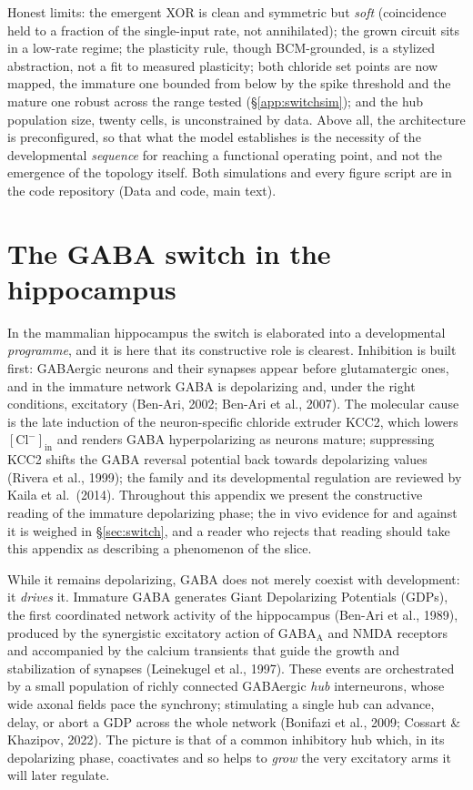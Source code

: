 \documentclass[11pt,a4paper]{article}
\newcommand{\Clm}{\mathrm{Cl}^{-}}
\begin{document}
Honest limits: the emergent XOR is clean and symmetric but \emph{soft} (coincidence held to a fraction of the single-input rate, not annihilated); the grown circuit sits in a low-rate regime; the plasticity rule, though BCM-grounded, is a stylized abstraction, not a fit to measured plasticity; both chloride set points are now mapped, the immature one bounded from below by the spike threshold and the mature one robust across the range tested (\S\ref{app:switchsim}); and the hub population size, twenty cells, is unconstrained by data. Above all, the architecture is preconfigured, so that what the model establishes is the necessity of the developmental \emph{sequence} for reaching a functional operating point, and not the emergence of the topology itself. Both simulations and every figure script are in the code repository (Data and code, main text).


\FloatBarrier
\section{The GABA switch in the hippocampus}\label{app:hipp}
In the mammalian hippocampus the switch is elaborated into a developmental \emph{programme}, and it is here that its constructive role is clearest. Inhibition is built first: GABAergic neurons and their synapses appear before glutamatergic ones, and in the immature network GABA is depolarizing and, under the right conditions, excitatory (Ben-Ari, 2002; Ben-Ari et al., 2007). The molecular cause is the late induction of the neuron-specific chloride extruder KCC2, which lowers $[\Clm]_{\mathrm{in}}$ and renders GABA hyperpolarizing as neurons mature; suppressing KCC2 shifts the GABA reversal potential back towards depolarizing values (Rivera et al., 1999); the family and its developmental regulation are reviewed by Kaila et al.\ (2014). Throughout this appendix we present the constructive reading of the immature depolarizing phase; the in vivo evidence for and against it is weighed in \S\ref{sec:switch}, and a reader who rejects that reading should take this appendix as describing a phenomenon of the slice.

While it remains depolarizing, GABA does not merely coexist with development: it \emph{drives} it. Immature GABA generates Giant Depolarizing Potentials (GDPs), the first coordinated network activity of the hippocampus (Ben-Ari et al., 1989), produced by the synergistic excitatory action of GABA$_{\mathrm{A}}$ and NMDA receptors and accompanied by the calcium transients that guide the growth and stabilization of synapses (Leinekugel et al., 1997). These events are orchestrated by a small population of richly connected GABAergic \emph{hub} interneurons, whose wide axonal fields pace the synchrony; stimulating a single hub can advance, delay, or abort a GDP across the whole network (Bonifazi et al., 2009; Cossart \& Khazipov, 2022). The picture is that of a common inhibitory hub which, in its depolarizing phase, coactivates and so helps to \emph{grow} the very excitatory arms it will later regulate.
\end{document}
